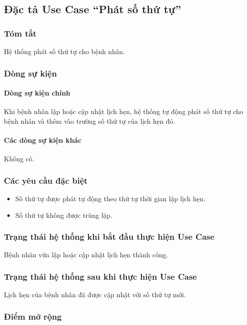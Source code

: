 \subsection{Đặc tả Use Case ``Phát số thứ tự''}

\subsubsection{Tóm tắt}
Hệ thống phát số thứ tự cho bệnh nhân.

\subsubsection{Dòng sự kiện}
\paragraph{\textbf{Dòng sự kiện chính}}
Khi bệnh nhân lập hoặc cập nhật lịch hẹn, hệ thống tự động phát số thứ tự cho bệnh nhân và thêm vào trường số thứ tự của lịch hẹn đó.

\paragraph{\textbf{Các dòng sự kiện khác}}
Không có.

\subsubsection{Các yêu cầu đặc biệt}
\begin{itemize}
  \item Số thứ tự được phát tự động theo thứ tự thời gian lập lịch hẹn.
  \item Số thứ tự không được trùng lặp.
\end{itemize}

\subsubsection{Trạng thái hệ thống khi bắt đầu thực hiện Use Case}
Bệnh nhân vừa lập hoặc cập nhật lịch hẹn thành công.

\subsubsection{Trạng thái hệ thống sau khi thực hiện Use Case}
Lịch hẹn của bệnh nhân đã được cập nhật với số thứ tự mới.

\subsubsection{Điểm mở rộng}